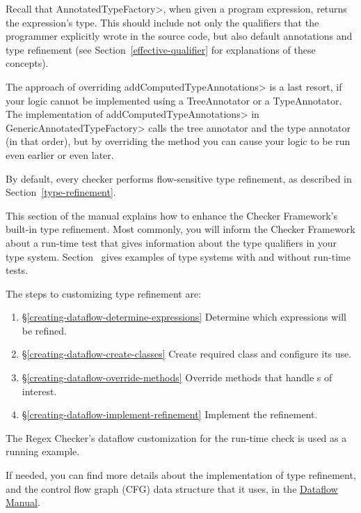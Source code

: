 \begin{enumerate}
  Recall that \<AnnotatedTypeFactory>, when given a program
  expression, returns the expression's type.  This should include not only
  the qualifiers that the programmer explicitly wrote in the source code, but
  also default annotations and type
  refinement (see Section~\ref{effective-qualifier} for explanations of these
  concepts).

  The approach of overriding \<addComputedTypeAnnotations> is a last
  resort, if your logic cannot be implemented using a TreeAnnotator or a
  TypeAnnotator.  The implementation of \<addComputedTypeAnnotations> in
  \<GenericAnnotatedTypeFactory> calls the tree annotator and the type
  annotator (in that order), but by overriding the method you can cause
  your logic to be run even earlier or even later.

\end{enumerate}



By default, every checker performs flow-sensitive type refinement, as described
in Section~\ref{type-refinement}.

This section of the manual explains how to enhance the Checker Framework's
built-in type refinement.
Most commonly, you will inform the Checker Framework about a run-time test
that gives information about the type qualifiers in your type system.
Section~ gives examples of
type systems with and without run-time tests.

The steps to customizing type refinement are:
\begin{enumerate}
\item{\S\ref{creating-dataflow-determine-expressions}}
  Determine which expressions will be refined.
\item{\S\ref{creating-dataflow-create-classes}}
  Create required class and configure its use.
\item{\S\ref{creating-dataflow-override-methods}}
  Override methods that handle s of interest.
\item{\S\ref{creating-dataflow-implement-refinement}}
  Implement the refinement.
\end{enumerate}

The Regex Checker's dataflow customization for the
run-time check is used as a running example.

If needed, you can find more details about the implementation of
type refinement, and the control flow graph (CFG) data
structure that it uses, in the
\href{https://checkerframework.org/manual/checker-framework-dataflow-manual.pdf}{Dataflow
  Manual}.


